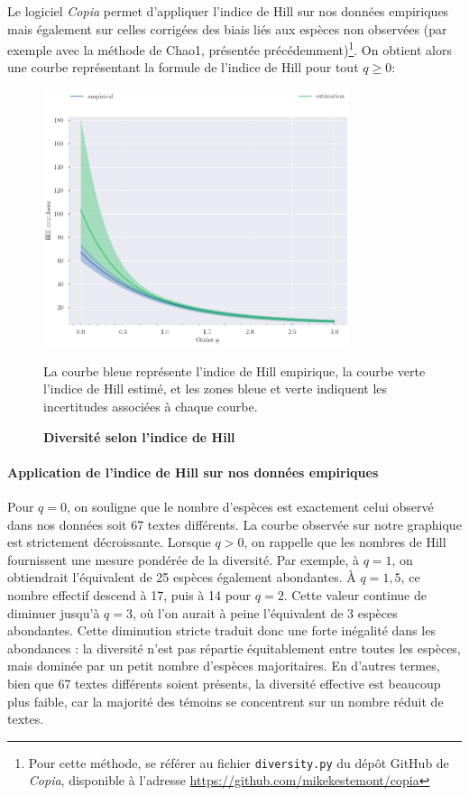 \documentclass[a4paper,twoside,12pt]{book}
\begin{document}
 
 
Le logiciel \textit{Copia} permet d'appliquer l'indice de Hill sur nos données empiriques mais également sur celles corrigées des biais liés aux espèces non observées (par exemple avec la méthode de Chao1, présentée précédemment)\footnote{Pour cette méthode, se référer au fichier \texttt{diversity.py} du dépôt GitHub de \textit{Copia}, disponible à l'adresse \url{https://github.com/mikekestemont/copia}}. On obtient alors une courbe représentant la formule de l'indice de Hill pour tout  $q \geq 0$:

\begin{figure}[H]
	\centering
	\includegraphics[width=0.8\textwidth]{img/hillnumber.png}
	\caption{\textbf{Diversité selon l’indice de Hill}}
	La courbe bleue représente l'indice de Hill empirique, la courbe verte l'indice de Hill estimé,
	et les zones bleue et verte indiquent les incertitudes associées à chaque courbe.	
	\label{fig:ton_label}
\end{figure}

\paragraph{Application de l'indice de Hill sur nos données empiriques} Pour \( q = 0 \), on souligne que le nombre d'espèces est exactement celui observé dans nos données soit 67 textes différents. La courbe observée sur notre graphique est strictement décroissante. Lorsque \( q > 0 \), on rappelle que les nombres de Hill fournissent une mesure pondérée de la diversité. Par exemple, à \( q = 1 \), on obtiendrait l’équivalent de 25 espèces également abondantes. À \( q = 1{,}5 \), ce nombre effectif descend à 17, puis à 14 pour \( q = 2 \). Cette valeur continue de diminuer jusqu’à \( q = 3 \), où l’on aurait à peine l’équivalent de 3 espèces abondantes. Cette diminution stricte traduit donc une forte inégalité dans les abondances : la diversité n’est pas répartie équitablement entre toutes les espèces, mais dominée par un petit nombre d’espèces majoritaires. En d'autres termes, bien que 67 textes différents soient présents, la diversité effective est beaucoup plus faible, car la majorité des témoins se concentrent sur un nombre réduit de textes.
\end{document}

